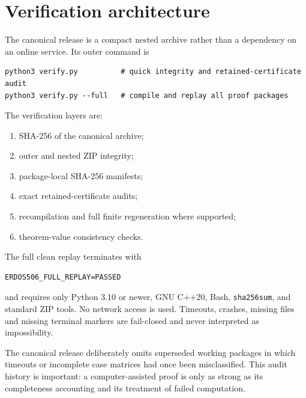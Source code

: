 \section{Verification architecture}

The canonical release is a compact nested archive rather than a dependency on an online service.  Its outer command is
\begin{verbatim}
python3 verify.py          # quick integrity and retained-certificate audit
python3 verify.py --full   # compile and replay all proof packages
\end{verbatim}
The verification layers are:
\begin{enumerate}
\item SHA-256 of the canonical archive;
\item outer and nested ZIP integrity;
\item package-local SHA-256 manifests;
\item exact retained-certificate audits;
\item recompilation and full finite regeneration where supported;
\item theorem-value consistency checks.
\end{enumerate}
The full clean replay terminates with
\begin{verbatim}
ERDOS506_FULL_REPLAY=PASSED
\end{verbatim}
and requires only Python 3.10 or newer, GNU C++20, Bash, \texttt{sha256sum}, and standard ZIP tools.  No network access is used.  Timeouts, crashes, missing files and missing terminal markers are fail-closed and never interpreted as impossibility.

The canonical release deliberately omits superseded working packages in which timeouts or incomplete case matrices had once been misclassified.  This audit history is important: a computer-assisted proof is only as strong as its completeness accounting and its treatment of failed computation.

